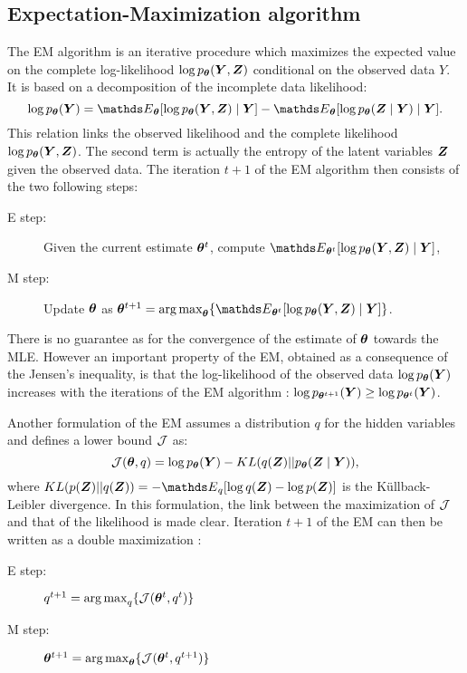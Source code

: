  \subsection{Expectation-Maximization algorithm}
 The EM algorithm is an iterative procedure which maximizes the expected value on  the complete log-likelihood $\log p_{\boldsymbol{\theta}} ({\boldsymbol{Y}}, {\boldsymbol{Z}})$ conditional on the observed data $Y$. It is based on a decomposition of the incomplete data likelihood:
 $$\log p_{\thetab} (\Ybf) = \Esp_\thetab [\log p_{\thetab} (\Ybf,\Zbf)\mid\Ybf] - \Esp_\thetab [\log p_{\thetab} (\Zbf\mid\Ybf) \mid \Ybf]. $$
This relation links the observed likelihood and the complete likelihood $\log p_{{\boldsymbol{\theta}}} ({\boldsymbol{Y}},{\boldsymbol{Z}})$. The second term is actually the entropy of the latent variables ${\boldsymbol{Z}}$ given the observed data.
The iteration $t+1$ of the EM algorithm then consists of the two following steps:
 \begin{description}
 \item [E step:] Given the current estimate ${\boldsymbol{\theta}}^t$, compute $\Esp_{\thetab^t}[\log p_\thetab (\Ybf, \Zbf)\mid \Ybf]$,
 \item [M step:] Update ${\boldsymbol{\theta}}$ as $\thetab^{t+1} = \argmax_\thetab \{ \Esp_{\thetab^t}[\log p_\thetab (\Ybf, \Zbf)\mid \Ybf]\}$.
 \end{description} 
There is no guarantee as for the convergence of the estimate of ${\boldsymbol{\theta}}$ towards the MLE. However an important property of the EM, obtained as a consequence of the Jensen's inequality,  is that the log-likelihood of the observed data $\log p_{{\boldsymbol{\theta}}} ({\boldsymbol{Y}})$ increases with the iterations of the EM algorithm \citep{DLR77}: $\log p_{{\boldsymbol{\theta}}^{t+1}} ({\boldsymbol{Y}})\geq \log p_{{\boldsymbol{\theta}}^t} ({\boldsymbol{Y}})$.
 
 Another formulation of the EM assumes a distribution $q$ for the hidden variables \citep{NH98} and defines a  lower bound ${\mathcal{J}}$ as:
 $${\mathcal{J}}({\boldsymbol{\theta}}, q) = \log p_{\boldsymbol{\theta}} ({\boldsymbol{Y}}) - KL(q({\boldsymbol{Z}}) || p_{\boldsymbol{\theta}}({\boldsymbol{Z}}\mid{\boldsymbol{Y}})),$$
 where $KL(p(\Zbf)||q(\Zbf)) = -\Esp_q[\log q(\Zbf) - \log p(\Zbf)]$ is the Küllback-Leibler divergence. In this formulation, the link between the maximization of ${\mathcal{J}}$ and that of the likelihood is made clear. Iteration $t+1$ of the EM can then be written as a double maximization :
  \begin{description}
 \item [E step:]  $q^{t+1}=\operatorname*{arg\,max}_q \{ {\mathcal{J}}({\boldsymbol{\theta}}^t, q^t)\}$
 \item [M step:] ${\boldsymbol{\theta}}^{t+1} = \operatorname*{arg\,max}_{\boldsymbol{\theta}} \{ {\mathcal{J}}({\boldsymbol{\theta}}^t, q^{t+1})\}$
 \end{description} 
 
